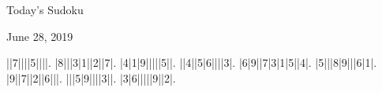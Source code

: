 \documentclass{article}
\begin{document}
\begin{center}
\Huge{Today's Sudoku}
\end{center}
\begin{center}
\Large{June 28, 2019}
\end{center}
\begin{sudoku}
||7||||5||||.
|8|||3|1||2||7|.
|4|1|9|||||5||.
||4||5|6||||3|.
|6|9||7|3|1|5||4|.
|5|||8|9|||6|1|.
|9||7||2||6|||.
|||5|9||||3||.
|3|6|||||9||2|.
\end{sudoku}
\end{document}
